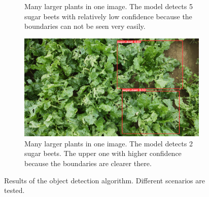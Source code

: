 \begin{figure}[htb!]
\begin{subfigure}{.6\textwidth}
		\caption{Many larger plants in one image. The model detects 5 sugar beets with relatively low confidence because the boundaries can not be seen very easily.}
		\label{fig:result_4}
	\end{subfigure}
	\begin{subfigure}{1\textwidth}
		\centering
		\includegraphics[scale=0.115]{figures/result_5.png}
		\caption{Many larger plants in one image. The model detects 2 sugar beets. The upper one with higher confidence because the boundaries are clearer there.}
		\label{fig:result_5}
	\end{subfigure}
	\caption{Results of the object detection algorithm. Different scenarios are tested.}
	\label{fig:final_results}
\end{figure}
